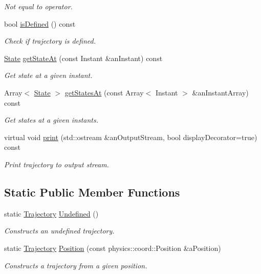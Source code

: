 \begin{DoxyCompactItemize}
\begin{DoxyCompactList}\small\item\em Not equal to operator. \end{DoxyCompactList}\item 
bool \hyperlink{classlibrary_1_1astro_1_1_trajectory_aab36edc2566e11d4b5de340cd8230dee}{is\+Defined} () const
\begin{DoxyCompactList}\small\item\em Check if trajectory is defined. \end{DoxyCompactList}\item 
\hyperlink{classlibrary_1_1astro_1_1trajectory_1_1_state}{State} \hyperlink{classlibrary_1_1astro_1_1_trajectory_a5b27c8ad8d547a00ad32c4ab1d63984f}{get\+State\+At} (const Instant \&an\+Instant) const
\begin{DoxyCompactList}\small\item\em Get state at a given instant. \end{DoxyCompactList}\item 
Array$<$ \hyperlink{classlibrary_1_1astro_1_1trajectory_1_1_state}{State} $>$ \hyperlink{classlibrary_1_1astro_1_1_trajectory_a0b7d9ed6012f968b1bfde1f2cc4e34f5}{get\+States\+At} (const Array$<$ Instant $>$ \&an\+Instant\+Array) const
\begin{DoxyCompactList}\small\item\em Get states at a given instants. \end{DoxyCompactList}\item 
virtual void \hyperlink{classlibrary_1_1astro_1_1_trajectory_a6f6afc6bcd8880d7debaa98a79bfa4e6}{print} (std\+::ostream \&an\+Output\+Stream, bool display\+Decorator=true) const
\begin{DoxyCompactList}\small\item\em Print trajectory to output stream. \end{DoxyCompactList}\end{DoxyCompactItemize}
\subsection*{Static Public Member Functions}
\begin{DoxyCompactItemize}
\item 
static \hyperlink{classlibrary_1_1astro_1_1_trajectory}{Trajectory} \hyperlink{classlibrary_1_1astro_1_1_trajectory_a0a8685cabc646fcc5b7f046a606ae967}{Undefined} ()
\begin{DoxyCompactList}\small\item\em Constructs an undefined trajectory. \end{DoxyCompactList}\item 
static \hyperlink{classlibrary_1_1astro_1_1_trajectory}{Trajectory} \hyperlink{classlibrary_1_1astro_1_1_trajectory_a39e9a50f84016cb53ca36d61809dc058}{Position} (const physics\+::coord\+::\+Position \&a\+Position)
\begin{DoxyCompactList}\small\item\em Constructs a trajectory from a given position. \end{DoxyCompactList}\end{DoxyCompactItemize}
